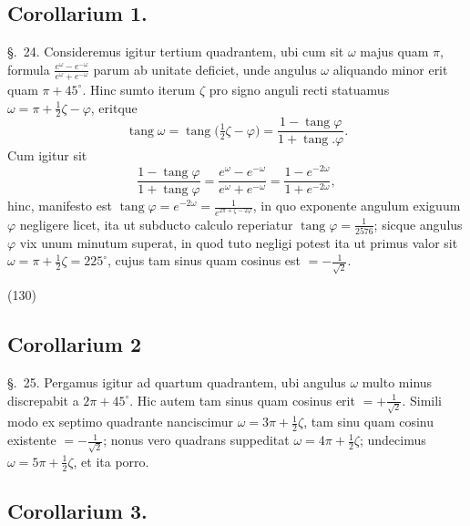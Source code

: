 \documentclass[11pt,a4paper]{article}
\begin{document}
\subsection{Corollarium 1.}

§.~24. Consideremus igitur tertium quadrantem, ubi cum sit $\omega$ majus quam
$\pi$, formula $\frac{e^\omega - e^{-\omega}}{e^\omega + e^{-\omega}}$ parum ab unitate
deficiet, unde angulus $\omega$ aliquando minor erit quam $\pi + 45^\circ$. Hinc
sumto iterum $\zeta$ pro signo anguli recti statuamus
$\omega = \pi + \frac{1}{2}\zeta - \varphi$, eritque
\[
\operatorname{tang}\omega = \operatorname{tang}\bigl(\tfrac{1}{2}\zeta - \varphi\bigr) = \frac{1 - \operatorname{tang}\varphi}{1 + \operatorname{tang}.\varphi}.
\]
Cum igitur sit
\[
\frac{1 - \operatorname{tang}\varphi}{1 + \operatorname{tang}\varphi} = \frac{e^\omega - e^{-\omega}}{e^\omega + e^{-\omega}} = \frac{1 - e^{-2\omega}}{1 + e^{-2\omega}},
\]
hinc, manifesto est $\operatorname{tang}\varphi = e^{-2\omega} = \frac{1}{e^{2\pi + \zeta - 2\varphi}}$,
in quo exponente angulum exiguum \emph{$\varphi$} negligere licet, ita ut subducto
calculo reperiatur $\operatorname{tang}\varphi = \frac{1}{2576}$; sicque angulus
$\varphi$ vix unum minutum superat, in quod tuto negligi potest ita ut primus valor
sit $\omega = \pi + \frac{1}{2}\zeta = 225^\circ$, cujus tam sinus quam cosinus est
$= -\frac{1}{\sqrt{2}}$.

(130)

\subsection{Corollarium 2}

§.~25. Pergamus igitur ad quartum quadrantem, ubi angulus $\omega$ multo minus
discrepabit a $2\pi + 45^\circ$. Hic autem tam sinus quam cosinus erit
$= +\frac{1}{\sqrt{2}}$. Simili modo ex septimo quadrante nanciscimur
$\omega = 3\pi + \frac{1}{2}\zeta$, tam sinu quam cosinu existente
$= -\frac{1}{\sqrt{2}}$; nonus vero quadrans suppeditat
$\omega = 4\pi + \frac{1}{2}\zeta$; undecimus $\omega = 5\pi + \frac{1}{2}\zeta$, et ita
porro.

\subsection{Corollarium 3.}
\end{document}
